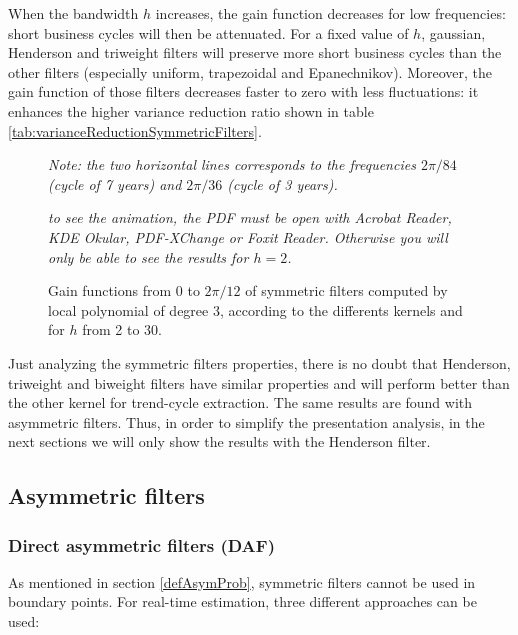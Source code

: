 \documentclass[
  12pt,
  ,
  a4paper]{article}
\newcommand\1{\mathds{1}}
\begin{document}
When the bandwidth \(h\) increases, the gain function decreases for low frequencies: short business cycles will then be attenuated.
For a fixed value of \(h\), gaussian, Henderson and triweight filters will preserve more short business cycles than the other filters (especially uniform, trapezoidal and Epanechnikov).
Moreover, the gain function of those filters decreases faster to zero with less fluctuations: it enhances the higher variance reduction ratio shown in table \ref{tab:varianceReductionSymmetricFilters}.

\begin{figure}[!ht]
\caption{Gain functions from 0 to $2\pi/12$ of symmetric filters computed by local polynomial of degree $3$, according to the differents kernels and for $h$ from 2 to 30.}\label{fig:filtersSymgains}\footnotesize
\emph{Note: the two horizontal lines corresponds to the frequencies $2\pi/84$ (cycle of 7 years) and $2\pi/36$ (cycle of 3 years).}

\emph{to see the animation, the PDF must be open with Acrobat Reader, KDE Okular, PDF-XChange or Foxit Reader.
Otherwise you will only be able to see the results for $h=2$.}
\end{figure}

Just analyzing the symmetric filters properties, there is no doubt that Henderson, triweight and biweight filters have similar properties and will perform better than the other kernel for trend-cycle extraction.
The same results are found with asymmetric filters.
Thus, in order to simplify the presentation analysis, in the next sections we will only show the results with the Henderson filter.

\hypertarget{asymmetric-filters}{%
\subsection{Asymmetric filters}\label{asymmetric-filters}}

\hypertarget{direct-asymmetric-filters-daf}{%
\subsubsection{Direct asymmetric filters (DAF)}\label{direct-asymmetric-filters-daf}}

As mentioned in section \ref{defAsymProb}, symmetric filters cannot be used in boundary points. For real-time estimation, three different approaches can be used:
\end{document}
